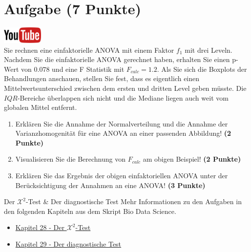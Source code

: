 \documentclass[a4paper, 10pt]{scrartcl}\usepackage[]{graphicx}\usepackage[]{xcolor}
\begin{document}
 
\clearpage

\section{Aufgabe \hfill (7 Punkte)}

\hfill\href{https://youtu.be/M9Uhm67ndxM}{\includegraphics[width =
  2cm]{img/youtube}}\\[1Ex]




Sie rechnen eine einfaktorielle ANOVA mit einem Faktor $f_1$ mit
drei Leveln. Nachdem Sie die einfaktorielle ANOVA gerechnet
haben, erhalten Sie einen p-Wert von $0.078$ und eine F Statistik mit
$F_{calc} = 1.2$. Als Sie sich die Boxplots der Behandlungen anschauen,
stellen Sie fest, dass es eigentlich einen Mittelwertsunterschied zwischen
dem ersten und dritten Level geben m{\"u}sste. Die
$IQR$-Bereiche {\"u}berlappen sich nicht und die Mediane liegen auch weit vom
globalen Mittel entfernt.


\begin{enumerate}
\item Erkl{\"a}ren Sie die Annahme der Normalverteilung und die Annahme der
  Varianzhomogenit{\"a}t f{\"u}r eine ANOVA an einer passenden Abbildung! \textbf{(2 Punkte)}
\item Visualisieren Sie die Berechnung von $F_{calc}$ am obigen Beispiel!
  \textbf{(2 Punkte)}
\item Erkl{\"a}ren Sie das Ergebnis der obigen einfaktoriellen ANOVA unter der
  Ber{\"u}cksichtigung der Annahmen an eine ANOVA! \textbf{(3 Punkte)}
\end{enumerate}

 
\clearpage
  \begin{graybox}{Der $\mathcal{X}^2$-Test \& Der diagnostische Test}
Mehr Informationen zu den Aufgaben in den folgenden Kapiteln aus dem Skript Bio Data Science.
  \begin{itemize}
  \item \href{https://jkruppa.github.io/stat-tests-chi-test.html}{Kapitel 28 - Der $\mathcal{X}^2$-Test}
  \item \href{https://jkruppa.github.io/stat-tests-diagnostic.html}{Kapitel 29 - Der diagnostische Test}
  \end{itemize}
\end{graybox}
\clearpage
\end{document}
